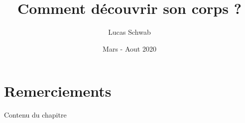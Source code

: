 \documentclass[11pt,french]{report}
\title{Comment découvrir son corps ?}
\author{Lucas Schwab}
\date{Mars - Aout 2020}
\begin{document}
\maketitle








\tableofcontents

\chapter{Remerciements}
Contenu du chapitre
\end{document}
